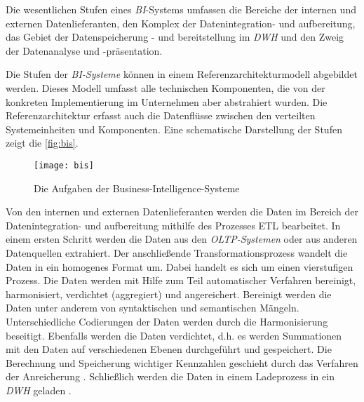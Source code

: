 Die wesentlichen Stufen eines \textit{\acrshort{BI}}-Systems umfassen die Bereiche der internen und externen Datenlieferanten, den Komplex der Datenintegration- und aufbereitung, 
das Gebiet der Datenspeicherung - und bereitstellung im \textit{\acrshort{DWH}} und den Zweig der Datenanalyse und -präsentation\cites[vgl.][126 ff.]{linden_geschaftsmodellbasierte_2016}[vgl.][8]{kemper_business_2010}. 

Die Stufen der \textit{\acrshort{BI}-Systeme} können in einem Referenzarchitekturmodell abgebildet werden. Dieses Modell umfasst alle technischen Komponenten, die von 
der konkreten Implementierung im Unternehmen aber abstrahiert wurden. Die Referenzarchitektur erfasst auch die Datenflüsse zwischen den verteilten Systemeinheiten und Komponenten\cite[vgl.][126 ff.]{linden_geschaftsmodellbasierte_2016}.
Eine schematische Darstellung der Stufen zeigt die \autoref{fig:bis}.

\begin{figure}[h]
    \centering
        \texttt{[image: bis]}
        \caption{Die Aufgaben der Business-Intelligence-Systeme}
        \label{fig:bis}
\end{figure}

Von den internen und externen Datenlieferanten werden die Daten im Bereich der Datenintegration- und aufbereitung mithilfe des Prozesses \acrfull{ETL} bearbeitet. 
In einem ersten Schritt werden die Daten aus den \textit{\acrshort{OLTP}-Systemen} oder aus anderen Datenquellen extrahiert. 
Der anschließende Transformationsprozess wandelt die Daten in ein homogenes Format um. Dabei handelt es sich um einen vierstufigen Prozess. Die Daten werden mit Hilfe 
zum Teil automatischer Verfahren bereinigt, harmonisiert, verdichtet (aggregiert) und angereichert.
Bereinigt werden die Daten unter anderem von syntaktischen und semantischen Mängeln. Unterschiedliche Codierungen der Daten werden durch die Harmonisierung 
beseitigt. Ebenfalls werden die Daten verdichtet, d.h. es werden Summationen mit den Daten auf verschiedenen Ebenen durchgeführt und gespeichert. 
Die Berechnung und Speicherung wichtiger Kennzahlen geschieht durch das Verfahren der Anreicherung \cites[Vgl.][86]{gronwald_integrierte_2020}[vgl.][277 f.]{abts_grundkurs_2017}.
Schließlich werden die Daten in einem Ladeprozess in ein \textit{\acrshort{DWH}} geladen \cite[vgl.][129 ff.]{linden_geschaftsmodellbasierte_2016}. 

